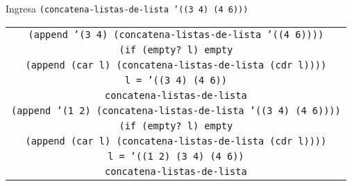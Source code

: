 \documentclass[letterpaper,11pt]{article}
\begin{document}
\begin{enumerate}
\begin{enumerate}
        Ingresa \texttt{(concatena-listas-de-lista '((3 4) (4 6)))}
        \begin{center}
            \begin{tabular}{|c|}
                \hline
                \texttt{(append '(3 4) 
                (concatena-listas-de-lista '((4 6))))}  \\
                \texttt{(if (empty? l) empty} \\
                \texttt{(append (car l) (concatena-listas-de-lista (cdr l))))} \\
                \texttt{l = '((3 4) (4 6))} \\
                \texttt{concatena-listas-de-lista} \\
                \hline
                \hline
                \texttt{(append '(1 2) 
                (concatena-listas-de-lista '((3 4) (4 6))))}  \\
                \texttt{(if (empty? l) empty} \\
                \texttt{(append (car l) (concatena-listas-de-lista (cdr l))))} \\
                \texttt{l = '((1 2) (3 4) (4 6))} \\
                \texttt{concatena-listas-de-lista} \\
                \hline
            \end{tabular}
        \end{center}


\end{enumerate}
\end{enumerate}
\end{document}
